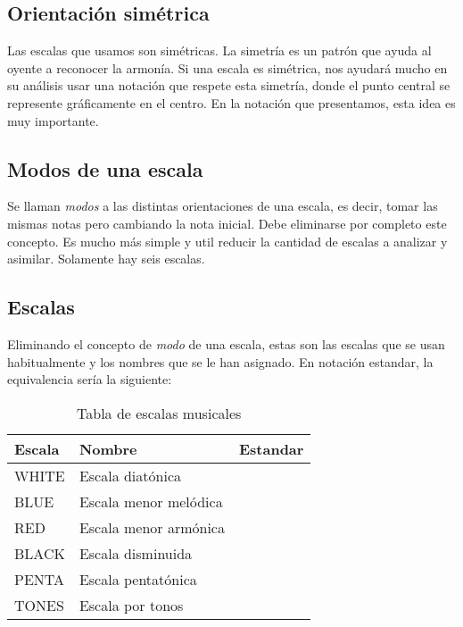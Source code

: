 \documentclass[]{article}
\begin{document}
\subsection{Orientación simétrica}

Las escalas que usamos son simétricas. La simetría es un patrón que ayuda al oyente a reconocer la armonía. Si una escala es simétrica, nos ayudará mucho en su análisis usar una notación que respete esta simetría, donde el punto central se represente gráficamente en el centro. En la notación que presentamos, esta idea es muy importante.

\subsection{Modos de una escala}

Se llaman \emph{modos} a las distintas orientaciones de una escala, es decir, tomar las mismas notas pero cambiando la nota inicial. Debe eliminarse por completo este concepto. Es mucho más simple y util reducir la cantidad de escalas a analizar y asimilar. Solamente hay seis escalas.

\subsection{Escalas}

Eliminando el concepto de \emph{modo} de una escala, estas son las escalas que se usan habitualmente y los nombres que se le han asignado. En notación estandar, la equivalencia sería la siguiente:

\begin{table}[htbp]
  \centering
  \begin{tabular}{lll}
    \toprule
    \textbf{\textsf{Escala}} & \textbf{Nombre} & \textbf{Estandar} \\
    \midrule
    \textsf{WHITE}   & Escala diatónica & \\
    \textsf{BLUE}    & Escala menor melódica & \\
    \textsf{RED} & Escala menor armónica & \\
    \textsf{BLACK}   & Escala disminuida & \\
    \textsf{PENTA}   & Escala pentatónica & \\
    \textsf{TONES}   & Escala por tonos & \\
    \bottomrule
  \end{tabular}
  \caption{Tabla de escalas musicales}
  \label{tab:scale-name-equivalences}
\end{table}
\end{document}
